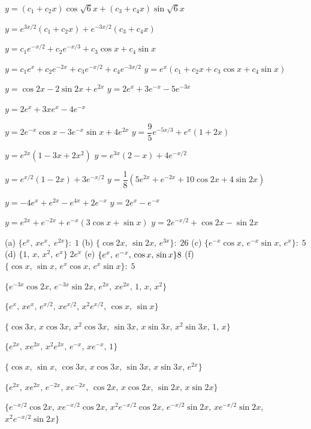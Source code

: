  $y=(c_1+c_2x)\cos\sqrt{6} x+(c_3+c_4x)\sin\sqrt{6} x$

$y=e^{3x/2}(c_1+c_2x)+e^{-3x/2}(c_3+c_4x)$\;

$y=c_1e^{-x/2}+c_2e^{-x/3}+c_3\cos x+c_4\sin x$

$y=c_1e^x+c_2e^{-2x}+c_3e^{-x/2}+c_4e^{-3x/2}$\;
$y=e^x(c_1+c_2x+c_3\cos x+c_4\sin x)$

  $y=\cos2x-2\sin2x+e^{2x}$\;
   $y=2e^x+3e^{-x}-5e^{-3x}$

  $y=2e^x+3xe^x-4e^{-x}$

 $y=2e^{-x}\cos x-3e^{-x}\sin x+4e^{2x}$
 $y=\dfrac{9}{5}e^{-5x/3}+e^x(1+2x)$

 $y=e^{2x}(1-3x+2x^2)$
 $y=e^{3x}(2-x)+4e^{-x/2}$

 $y=e^{x/2}(1-2x)+3e^{-x/2}$
 $y=\dfrac{1}{8}(5e^{2x}+e^{-2x}+10\cos2x+4\sin2x)$

 $y=-4e^x+e^{2x}-e^{4x}+2e^{-x}$
 $y=2e^x-e^{-x}$

 $y=e^{2x}+e^{-2x}+e^{-x}(3\cos x+\sin x)$
 $y=2e^{-x/2}+\cos2x-\sin2x$

(a) $\{e^x,\,xe^x,\;  e^{2x}\}:\;   1$
(b) $\{\cos2x,\,\sin2x,\,e^{3x}\}: \; 26$
 (c) $\{e^{-x}\cos x,\,e^{-x}\sin x,\,e^x\}: \; 5$
 (d) $\{1,\,x,\,x^2,\,e^x\} \; 2e^x$
(e) $\{e^x,\,e^{-x},\,\cos x,\,\sin x\}   \-8$\;
 (f) $\{\cos x,\,\sin x,\,e^x\cos x,\,e^x\sin x\}:\; 5$

 $\{e^{-3x}\cos2x,\,e^{-3x}\sin2x,\,e^{2x},\,xe^{2x},\,1,\,
x,\,x^2\}$

 $\{e^x,\,xe^x,\,e^{x/2},\,xe^{x/2},\,x^2e^{x/2},\,\cos x,\,\sin x\}$

 $\{\cos3x,\,x\cos3x,\,x^2\cos3x,\,\sin3x,\,x\sin3x,
\,x^2\sin3x,\,1,\,x\}$

 $\{e^{2x},\,xe^{2x},\,x^2e^{2x},\,e^{-x},\,xe^{-x},\,1\}$

 $\{\cos x,\,\sin x,\,\cos3x,\,x\cos  3x,\,\sin3x,\,x\sin3x,
\,e^{2x}\}$

 $\{e^{2x},\,xe^{2x},\,e^{-2x},\,xe^{-2x},\,\cos2x,\,x\cos2x,
\,\sin2x,\,x\sin2x\}$

 $\{e^{-x/2}\cos2x,\,xe^{-x/2}\cos2x,\,x^2e^{-x/2}\cos2x
,\,e^{-x/2}\sin2x,\,xe^{-x/2}\sin2x$,
$x^2e^{-x/2}\sin2x\}$

